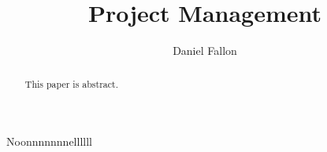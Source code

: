 \documentclass[conference]{IEEEtran}
\title{Project Management\\\normalsize{}}
\author{Daniel Fallon}
\begin{document}
\maketitle

\begin{abstract}
This paper is abstract.
\end{abstract}

Noonnnnnnnellllll \cite{hc_washingtonpost}


\end{document}
